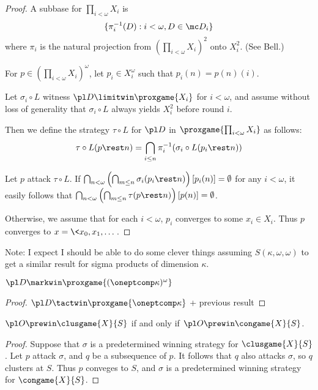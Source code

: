 \begin{proof}
  A subbase for $\prod_{i<\omega}X_i$ is
    \[
      \{\pi_i^{-1}(D):i<\omega, D\in\mc D_i\}
    \]
  where $\pi_i$ is the natural projection from 
  $\left(\prod_{i<\omega}X_i\right)^2$ onto $X_i^2$. (See Bell.)

  For $p\in \left(\prod_{i<\omega}X_i\right)^\omega$, let $p_i\in X_i^\omega$
  such that $p_i(n)=p(n)(i)$.

  Let $\sigma_i\circ L$ witness $\pl D\limitwin \proxgame{X_i}$ for
  $i<\omega$, and assume without loss of generality that 
  $\sigma_i\circ L$ always yields $X_i^2$ before round $i$.

  Then we define the strategy $\tau\circ L$ for $\pl D$ in
  $\proxgame{\prod_{i<\omega}X_i}$ as follows:
    \[
      \tau\circ L(p\rest n)
        =
      \bigcap_{i\leq n} \pi_i^{-1}(\sigma_i\circ L(p_i\rest n))
    \]

  Let $p$ attack $\tau\circ L$. If
    $
      \bigcap_{n<\omega}
      \left(\bigcap_{m\leq n}\sigma_i(p_i\rest n)\right)[p_i(n)]
      = \emptyset
    $
  for any $i<\omega$, it easily follows that 
    $
      \bigcap_{n<\omega}
      \left(\bigcap_{m\leq n}\tau(p\rest n)\right)[p(n)]
      = \emptyset
    $.

  Otherwise, we assume that for each $i<\omega$, $p_i$ converges to some
  $x_i\in X_i$. Thus $p$ converges to $x=\<x_0,x_1,\dots\>$.
\end{proof}

Note: I expect I should be able to do some clever things 
assuming $S(\kappa,\omega,\omega)$ to get a similar result for sigma
products of dimension $\kappa$.

\begin{ex}
  $\pl D \markwin \proxgame{(\oneptcomp\kappa)^\omega}$
\end{ex}

\begin{proof}
  $\pl D \tactwin \proxgame{\oneptcomp\kappa}$ + previous result
\end{proof}




\newpage

\begin{lem}
  $\pl O\prewin\clusgame{X}{S}$ if and only if $\pl O\prewin\congame{X}{S}$.
\end{lem}

\begin{proof}
  Suppose that $\sigma$ is a predetermined winning strategy for 
  $\clusgame{X}{S}$. Let $p$ attack $\sigma$, and $q$ be a subsequence of $p$.
  It follows that $q$ also attacks $\sigma$, so $q$ clusters at $S$. Thus $p$
  conveges to $S$, and $\sigma$ is a predetermined winning strategy for 
  $\congame{X}{S}$.
\end{proof}

